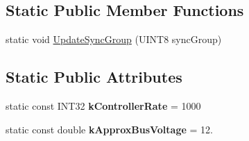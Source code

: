 \subsection*{\-Static \-Public \-Member \-Functions}
\begin{DoxyCompactItemize}
\item 
static void \hyperlink{class_l_r_t_c_a_n_jaguar_acd27d3ef0266402cec9fe9b6d5999626}{\-Update\-Sync\-Group} (\-U\-I\-N\-T8 sync\-Group)
\end{DoxyCompactItemize}
\subsection*{\-Static \-Public \-Attributes}
\begin{DoxyCompactItemize}
\item 
\hypertarget{class_l_r_t_c_a_n_jaguar_aba356384ece87f80a237c24f93e065b8}{
static const \-I\-N\-T32 {\bfseries k\-Controller\-Rate} = 1000}
\label{class_l_r_t_c_a_n_jaguar_aba356384ece87f80a237c24f93e065b8}

\item 
\hypertarget{class_l_r_t_c_a_n_jaguar_aba33c3ade66911fc08c33e0c6726570a}{
static const double {\bfseries k\-Approx\-Bus\-Voltage} = 12.}
\label{class_l_r_t_c_a_n_jaguar_aba33c3ade66911fc08c33e0c6726570a}

\end{DoxyCompactItemize}
